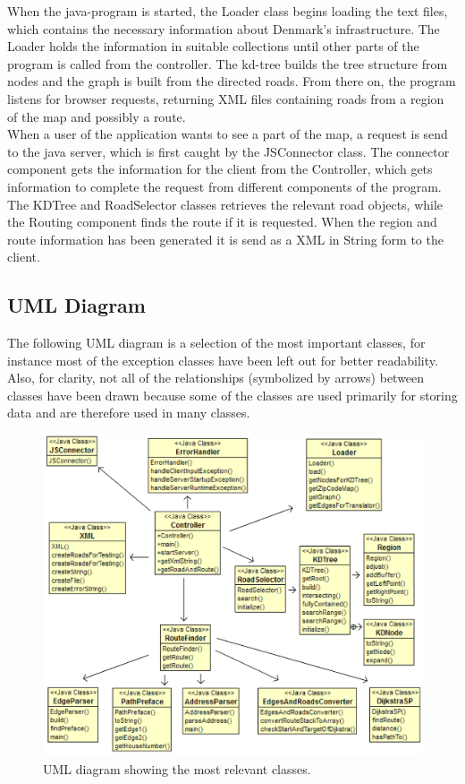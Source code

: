 \documentclass[a4paper,10pt,titlepage]{article}
\begin{document}
		When the java-program is started, the Loader class begins loading the text files, which contains the necessary information about Denmark’s infrastructure. The Loader holds the information in suitable collections until other parts of the program is called from the controller. The kd-tree builds the tree structure from nodes and the graph is built from the directed roads. From there on, the program listens for browser requests, returning XML files containing roads from a region of the map and possibly a route.\\
When a user of the application wants to see a part of the map, a request is send to the java server, which is first caught by the JSConnector class.  The connector component gets the information for the client from the Controller, which gets information to complete the request from different components of the program. The KDTree and RoadSelector classes retrieves the relevant road objects, while the Routing component finds the route if it is requested. When the region and route information has been generated it is send as a XML in String form to the client. 

		\subsection{UML Diagram}
		The following UML diagram is a selection of the most important classes, for instance most of the exception classes have been left out for better readability. Also, for clarity, not all of the relationships (symbolized by arrows) between classes have been drawn because some of the classes are used primarily for storing data and are therefore used in many classes. 
		\begin{figure}[H]
\includegraphics[width=120mm]{umlArrows.png}
\caption{UML diagram showing the most relevant classes.}
\label{fig:uml}
\end{figure}
		
\end{document}
